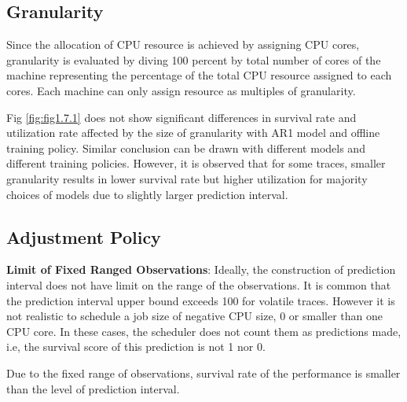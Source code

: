 \documentclass{article}
\begin{document}
\subsection{Granularity}

\begin{flushleft}
Since the allocation of CPU resource is achieved by assigning CPU cores, granularity is evaluated by diving 100 percent by total number of cores of the machine representing the percentage of the total CPU resource assigned to each cores. Each machine can only assign resource as multiples of granularity.

Fig \ref{fig:fig1.7.1} does not show significant differences in survival rate and utilization rate affected by the size of granularity with AR1 model and offline training policy. Similar conclusion can be drawn with different models and different training policies. However, it is observed that for some traces, smaller granularity results in lower survival rate but higher utilization for majority choices of models due to slightly larger prediction interval.
\end{flushleft}

\subsection{Adjustment Policy}

\begin{flushleft}
\textbf{Limit of Fixed Ranged Observations}: Ideally, the construction of prediction interval does not have limit on the range of the observations. It is common that the prediction interval upper bound exceeds 100 for volatile traces. However it is not realistic to schedule a job size of negative CPU size, 0 or smaller than one CPU core. In these cases, the scheduler does not count them as predictions made, i.e, the survival score of this prediction is not 1 nor 0.

Due to the fixed range of observations, survival rate of the performance is smaller than the level of prediction interval.
\end{flushleft}
\end{document}
